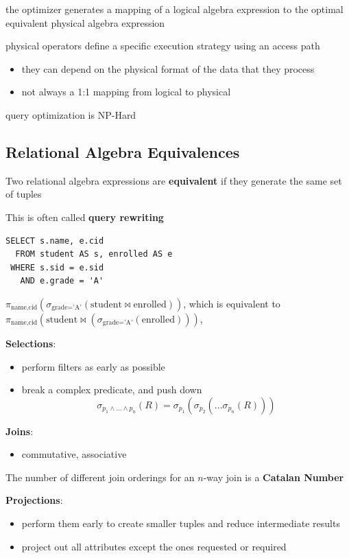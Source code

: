 \documentclass[11pt]{article}
\begin{document}
the optimizer generates a mapping of a logical algebra expression to the optimal equivalent
physical algebra expression

physical operators define a specific execution strategy using an access path
\begin{itemize}
\item they can depend on the physical format of the data that they process
\item not always a 1:1 mapping from logical to physical
\end{itemize}

query optimization is NP-Hard
\subsection{Relational Algebra Equivalences}
\label{sec:orgc6d979a}
Two relational algebra expressions are \textbf{equivalent} if they generate the same set of tuples

This is often called \textbf{query rewriting}

\begin{verbatim}
SELECT s.name, e.cid
  FROM student AS s, enrolled AS e
 WHERE s.sid = e.sid
   AND e.grade = 'A'
\end{verbatim}
\(\pi_{\text{name},\text{cid}}(\sigma_{\text{grade='A'}}(\text{student}\bowtie\text{enrolled}))\),
which is equivalent to
\(\pi_{\text{name},\text{cid}}(\text{student}\bowtie(\sigma_{\text{grade='A'}}(\text{enrolled})))\),

\textbf{Selections}:
\begin{itemize}
\item perform filters as early as possible
\item break a complex predicate, and push down
\begin{equation*}
\sigma_{p_1\wedge\dots\wedge p_n}(R)=\sigma_{p_1}(\sigma_{p_2}(\dots\sigma_{p_n}(R)))
\end{equation*}
\end{itemize}

\textbf{Joins}:
\begin{itemize}
\item commutative, associative
\end{itemize}

The number of different join orderings for an \(n\)-way join is a \textbf{Catalan Number}

\textbf{Projections}:
\begin{itemize}
\item perform them early to create smaller tuples and reduce intermediate results
\item project out all attributes except the ones requested or required
\end{itemize}
\end{document}
